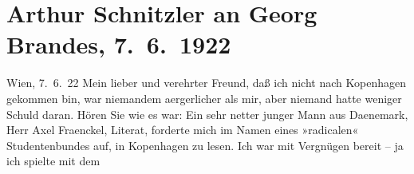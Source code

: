 

         
         \renewcommand{\erwaehntePersonen}{Personen: Georg Brandes, Axel Fraenckel, Heinrich Schnitzler, Lili Schnitzler, Olga Schnitzler}
         \renewcommand{\erwaehnteOrte}{Orte: Amsterdam, Athen, Berlin, Den Haag, Dänemark, Graz, Griechenland, Kopenhagen, München, Niederlande, Nürnberg, Raimund-Theater, Rotterdam, Universität Wien, Völser Weiher, Wien}
         \renewcommand{\erwaehnteWerke}{Werke: Das weite Land. Tragikomödie in fünf Akten, Komödie der Verführung. In drei Akten}
               \section[Arthur Schnitzler an Georg Brandes, 7. 6. 1922]{ Arthur Schnitzler an Georg Brandes, 7. 6. 1922}\nopagebreak{}\rehead{ }\begin{ledgroupsized}[t]{13cm}\normalsize\beginnumbering{} \toendnotes[C]{\smallbreak\pagebreak[2]} 
\toendnotes[C]{\smallbreak}\pstart
           \raggedleft{}{\pb}Wien, 7. 6. 22\pend
           \pstart
           Mein lieber und verehrter Freund, daß ich nicht nach Kopenhagen gekommen bin, war niemandem
               aergerlicher als mir, aber niemand hatte weniger Schuld daran. Hören Sie wie es war:
               Ein sehr netter junger Mann aus Daenemark, Herr
                  Axel Fraenckel, Literat, forderte mich im
               Namen eines »radicalen« Studentenbundes auf, in Kopenhagen zu lesen. Ich war mit Vergnügen bereit – ja ich spielte mit dem

\end{ledgroupsized}
